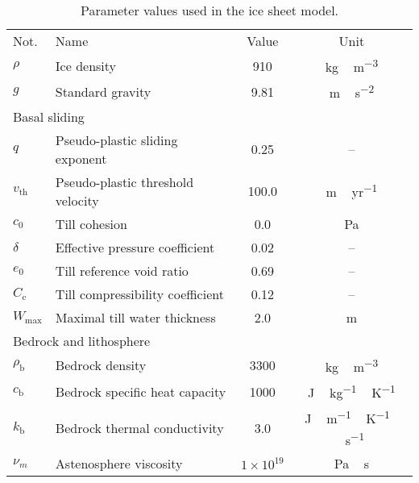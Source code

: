 \documentclass[tc, manuscript]{copernicus}
\begin{document}
\begin{table}[t]
\caption{%
      Parameter values used in the ice sheet model.}
{\begin{tabular}{llcc}
    \tophline
    Not.    & Name & Value & Unit \\
    \middlehline
    $\rho$  & Ice density
            & 910
            & \unit{kg\,m^{-3}} \\

    $g$     & Standard gravity
            & 9.81
            & \unit{m\,s^{-2}} \\
    \cline{1-4}
    \multicolumn{2}{l}{{Basal sliding}} \\
    \cline{1-4}
    $q$     & Pseudo-plastic sliding exponent
            & 0.25
            & -- \\

    $v_{\text{th}}$& Pseudo-plastic threshold velocity
            & 100.0
            & \unit{m\,yr^{-1}} \\

    $c_0$   & Till cohesion
            & 0.0
            & Pa \\

    $\delta$& Effective pressure coefficient
            & 0.02
            & -- \\

    $e_0$   & Till reference void ratio
            & 0.69
            & -- \\

    $C_{\mathrm{c}}$   & Till compressibility coefficient
            & 0.12
            & -- \\

    $W_{\text{max}}$ & Maximal till water thickness
            & 2.0
            & m \\
    \cline{1-4}
    \multicolumn{2}{l}{{Bedrock and lithosphere}} \\
    \cline{1-4}
    $\rho_{\mathrm{b}}$& Bedrock density
            & 3300
            & \unit{kg\,m^{-3}} \\

    $c_{\mathrm{b}}$   & Bedrock specific heat capacity
            & 1000
            & \unit{J\,kg^{-1}\,K^{-1}} \\

    $k_{\mathrm{b}}$   & Bedrock thermal conductivity
            & 3.0
            & \unit{J\,m^{-1}\,K^{-1}\,s^{-1}} \\

    $\nu_m$ & Astenosphere viscosity
            & $1\times10^{19}$
            & \unit{Pa\,s} \\


\end{tabular}}
\end{table}
\end{document}
